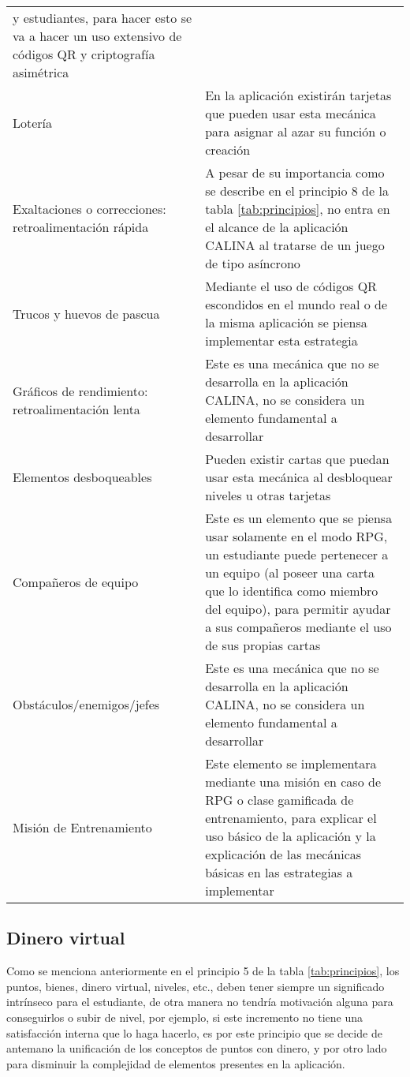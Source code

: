 \begin{longtable}{ p{50mm} p{100mm} }
y estudiantes, para hacer esto se va a hacer un uso extensivo de códigos QR y criptografía asimétrica
\\
Lotería
&
En la aplicación existirán tarjetas que pueden usar esta mecánica para asignar al azar su función o creación
\\
Exaltaciones o correcciones: retroalimentación rápida
&
A pesar de su importancia como se describe en el principio 8 de la tabla \ref{tab:principios}, no entra en el
alcance de la aplicación CALINA al tratarse de un juego de tipo asíncrono
\\
Trucos y huevos de pascua
&
Mediante el uso de códigos QR escondidos en el mundo real o de la misma aplicación se piensa implementar esta 
estrategia
\\
Gráficos de rendimiento: retroalimentación lenta
&
Este es una mecánica que no se desarrolla en la aplicación CALINA, no se considera un elemento fundamental a 
desarrollar
\\
Elementos desboqueables
& 
Pueden existir cartas que puedan usar esta mecánica al desbloquear niveles u otras tarjetas
\\
Compañeros de equipo
&
Este es un elemento que se piensa usar solamente en el modo RPG, un estudiante puede pertenecer a un equipo 
(al poseer una carta que lo identifica como miembro del equipo), para permitir ayudar a sus compañeros 
mediante el uso de sus propias cartas
\\
Obstáculos/enemigos/jefes
&
Este es una mecánica que no se desarrolla en la aplicación CALINA, no se considera un elemento fundamental a 
desarrollar
\\
Misión de Entrenamiento
&
Este elemento se implementara mediante una misión en caso de RPG o clase gamificada de entrenamiento, para 
explicar el uso básico de la aplicación y la explicación de las mecánicas básicas en las estrategias a 
implementar
\\
\end{longtable}
\endgroup

\subsection{Dinero virtual}

Como se menciona anteriormente en el principio 5 de la tabla \ref{tab:principios}, los puntos, bienes, dinero 
virtual, niveles, etc., deben tener siempre un significado intrínseco para el estudiante, de otra manera no 
tendría motivación alguna para conseguirlos o subir de nivel, por ejemplo, si este incremento no tiene una 
satisfacción interna que lo haga hacerlo, es por este principio que se decide de antemano la unificación de 
los conceptos de puntos con dinero, y por otro lado para disminuir la complejidad de elementos presentes en la 
aplicación.

